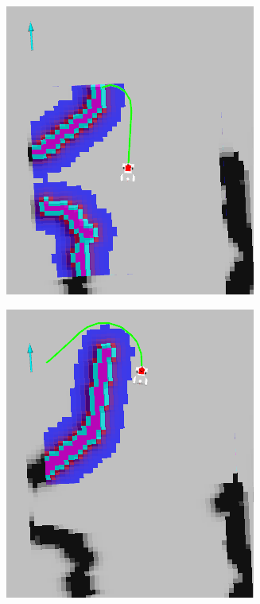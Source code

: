\documentclass[english, master, utf8]{base/thesis_KBS}
\begin{document}
\begin{figure}[H]
\begin{subfigure}[b]{0.24\textwidth}
        \includegraphics[width=\textwidth]{pics/succ_2.png}
        \caption{\textsc{}}
        \label{fig:succ_2}
    \end{subfigure}
    \begin{subfigure}[b]{0.24\textwidth}
        \centering
        \includegraphics[width=\textwidth]{pics/succ_3.png}

\end{subfigure}
\end{figure}
\end{document}
